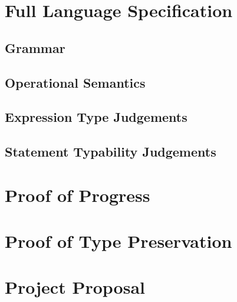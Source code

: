 \documentclass[12pt,a4paper,twoside,openright]{report}
\theoremstyle{definition}
\theoremstyle{dotless}
\begin{document}

\pagestyle{headings}

\printbibliography{}

\appendix

\chapter{Full Language Specification}


\section{Grammar}
\ottgrammar

\section{Operational Semantics}
\ottdefnreduce

\section{Expression Type Judgements}
\ottdefnexpType

\section{Statement Typability Judgements}
\ottdefntypable

\chapter{Proof of Progress}\label{app:progress}


\chapter{Proof of Type Preservation}\label{app:preservation}


\chapter{Project Proposal}


\end{document}

